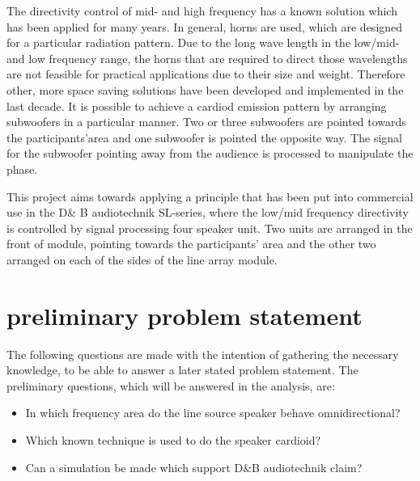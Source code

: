 The directivity control of mid- and high frequency has a known solution which has been applied for many years. In general, horns are used, which are designed for a particular radiation pattern. Due to the long wave length in the low/mid- and low frequency range, the horns that are required to direct those wavelengths are not feasible for practical applications due to their size and weight. Therefore other, more space saving solutions have been developed and implemented in the last decade. It is possible to achieve a cardiod emission pattern by arranging subwoofers in a particular manner. Two or three subwoofers are pointed towards the participants'area and one subwoofer is pointed the opposite way. The signal for the subwoofer pointing away from the audience is processed to manipulate the phase.


This project aims towards applying a principle that has been put into commercial use in the D\& B audiotechnik SL-series, where the low/mid frequency directivity is controlled by signal processing four speaker unit. Two units are arranged in the front of module, pointing towards the participants' area and the other two arranged on each of the sides of the line array module.



\section{preliminary problem statement}
The following questions are made with the intention of gathering the necessary knowledge, to be able to answer a later stated problem statement. The preliminary questions, which will be answered in the analysis, are:

\begin{itemize}
\item In which frequency area do the line source speaker behave omnidirectional?
\item Which known technique is used to do the speaker cardioid?
\item Can a simulation be made which support D\&B audiotechnik claim?
\end{itemize}



